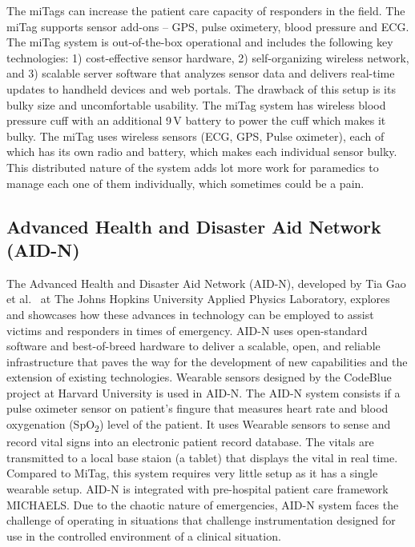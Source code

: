 The miTags can increase the patient care capacity of responders in
the field. The miTag supports sensor add-ons -- GPS, pulse oximetery,
blood pressure and ECG.  The miTag system is out-of-the-box
operational and includes the following key technologies: 1)
cost-effective sensor hardware, 2) self-organizing wireless network,
and 3) scalable server software that analyzes sensor data and
delivers real-time updates to handheld devices and web portals. The
drawback of this setup is its bulky size and uncomfortable usability.
The miTag system has wireless blood pressure cuff with an additional
9\,V battery to power the cuff which makes it bulky. The miTag uses
wireless sensors (ECG, GPS, Pulse oximeter), each of which has its
own radio and battery, which makes each individual sensor bulky. This
distributed nature of the system adds lot more work for paramedics to
manage each one of them individually, which sometimes could be a
pain. 


\subsection{Advanced Health
	and Disaster Aid Network (AID-N)}

The Advanced Health and Disaster Aid Network (AID-N), developed by
Tia Gao et al.~\cite{AID-N} at The Johns Hopkins University Applied
Physics Laboratory, explores and showcases how these advances in
technology can be employed to assist victims and responders in times
of emergency. AID-N uses open-standard software and best-of-breed
hardware to deliver a scalable, open, and reliable infrastructure
that paves the way for the development of new capabilities and the
extension of existing technologies.  Wearable sensors designed by the
CodeBlue project at Harvard University is used in AID-N. The AID-N
system consists if a pulse oximeter sensor on patient's fingure that
measures heart rate and blood oxygenation (SpO\textsubscript{2})
level of the patient. It uses Wearable sensors to sense and record
vital signs into an electronic patient record database. The vitals
are transmitted to a local base staion (a tablet) that displays the
vital in real time. Compared to MiTag, this system requires very
little setup as it has a single wearable setup. AID-N is integrated
with pre-hospital patient care framework MICHAELS. Due to the chaotic
nature of emergencies, AID-N system faces the challenge of operating
in situations that challenge instrumentation designed for use in the
controlled environment of a clinical situation. 


